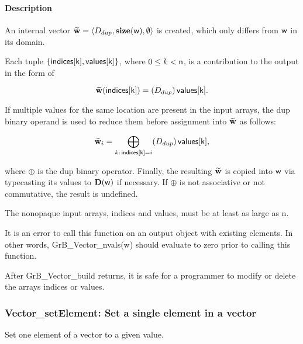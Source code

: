 \paragraph{Description}

An internal vector  ${\bf \widetilde{w}} = \langle D_{dup},\mathbf{size}({\sf w}),\emptyset \rangle$ is created, which only differs from ${\sf w}$ in its domain.

Each tuple $\{ {\sf indices[k]}, {\sf values[k]}\}$, where $0\leq k < {\sf n}$, is a contribution to the output in the form of 

$${\bf \widetilde{w}}({\sf indices[k]}) = (D_{dup})\, {\sf values[k]}.$$

If multiple values for the same location are present in the input arrays, the 
{\sf dup} binary operand is used to reduce them before assignment into ${\bf \widetilde{w}}$ as follows: 

\[
{\bf \widetilde{w}}_{i}
= \bigoplus_{k:\, {\sf indices[k]} = i}  (D_{dup})\, {\sf values[k]}
,\] 

where $\oplus$ is the {\sf dup} binary operator. Finally, the resulting 
${\bf \widetilde{w}}$ is copied into ${\sf w}$ via typecasting its values to 
$\mathbf{D}({\sf w})$ if necessary.  If $\oplus$ is not associative or not 
commutative, the result is undefined.  

The nonopaque input arrays, {\sf indices} and {\sf values}, must be at least as
large as {\sf n}. 

It is an error to call this function on an output object with existing elements. In other words, 
{\sf GrB\_Vector\_nvals(w)} should evaluate to zero prior to calling this function.

After {\sf GrB\_Vector\_build} returns, it is safe for a programmer to 
modify or delete the arrays {\sf indices} or {\sf values}.


\subsubsection{{\sf Vector\_setElement}: Set a single element in a vector}

Set one element of a vector to a given value.

\paragraph{\syntax}


